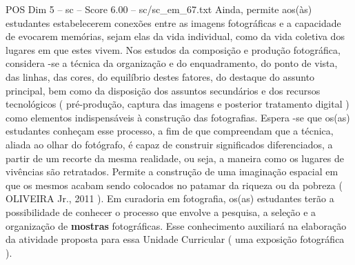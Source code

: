 \begin{textsample}{POS Dim 5 – sc – Score 6.00 – sc/sc\_em\_67.txt}
Ainda, permite aos(às) estudantes estabelecerem conexões entre as imagens fotográficas e a capacidade de evocarem memórias, sejam elas da vida individual, como da vida coletiva dos lugares em que estes vivem.
Nos estudos da composição e produção fotográfica, considera -se a técnica da organização e do enquadramento, do ponto de vista, das linhas, das cores, do equilíbrio destes fatores, do destaque do assunto principal, bem como da disposição dos assuntos secundários e dos recursos tecnológicos ( pré-produção, captura das imagens e posterior tratamento digital ) como elementos indispensáveis à construção das fotografias.
Espera -se que os(as) estudantes conheçam esse processo, a fim de que compreendam que a técnica, aliada ao olhar do fotógrafo, é capaz de construir significados diferenciados, a partir de um recorte da mesma realidade, ou seja, a maneira como os lugares de vivências são retratados.
Permite a construção de uma imaginação espacial em que os mesmos acabam sendo colocados no patamar da riqueza ou da pobreza ( OLIVEIRA Jr., 2011 ).
Em curadoria em fotografia, os(as) estudantes terão a possibilidade de conhecer o processo que envolve a pesquisa, a seleção e a organização de \textbf{mostras} fotográficas.
Esse conhecimento auxiliará na elaboração da atividade proposta para essa Unidade Curricular ( uma exposição fotográfica ).

\end{textsample}
